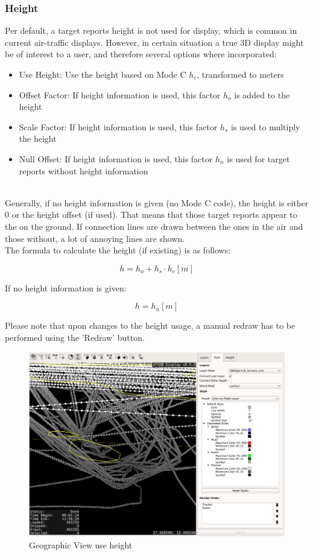 \subsubsection{Height}
\label{sec:others_height}

Per default, a target reports height is not used for display, which is common in current air-traffic displays. However, in certain situation a true 3D display might be of interest to a user, and therefore several options where incorporated:

\begin{itemize}
 \item Use Height: Use the height based on Mode C $h_c$, transformed to meters
 \item Offset Factor: If height information is used, this factor $h_o$ is added to the height
 \item Scale Factor: If height information is used, this factor $h_s$ is used to multiply the height
 \item Null Offset: If height information is used, this factor $h_n$ is used for target reports without height information
\end{itemize}
\ \\

Generally, if no height information is given (no Mode C code), the height is either $0$ or the height offset (if used). That means that those target reports appear to the on the ground. If connection lines are drawn between the ones in the air and those without, a lot of annoying lines are shown. \\

The formula to calculate the height (if existing) is as follows: 

$$ h = h_o + h_s \cdot h_c [m]$$ 

If no height information is given:

$$ h = h_n [m]$$ 

Please note that upon changes to the height usage, a manual redraw has to be performed using the 'Redraw' button.


\begin{figure}[H]
    \hspace*{-2.5cm}
    \includegraphics[width=19cm,frame]{figures/geoview_use_height.png}
  \caption{Geographic View use height}
\end{figure} 

